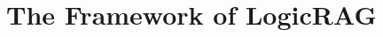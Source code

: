 \documentclass[letterpaper]{article} %
\newcommand{\shengyuan}[1]{\todo[inline,size=\footnotesize,color=red!20]{\textbf{shengyuan}: #1}}
\begin{document}


\section{The Framework of LogicRAG}

\end{document}
